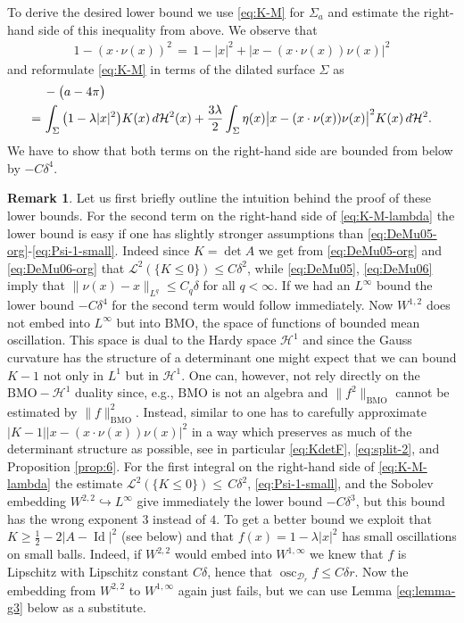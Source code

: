 \documentclass[reqno,makeidx,12pt]{amsart}
\theoremstyle{note}
\theoremstyle{definition}
\newtheorem*{remark-short}{Remark}
\begin{document}
To derive the desired lower bound we use \eqref{eq:K-M} for $\Sigma_a$ and estimate the right-hand side of this inequality from above. We observe that
\begin{gather*}
	1-(x\cdot\nu(x))^2 \,=\, 1 - |x|^2 + |x- (x\cdot\nu(x))\nu(x)|^2
\end{gather*}
and reformulate \eqref{eq:K-M} in terms of the dilated surface $\Sigma$ as
\begin{align}
	&-\big(a-4\pi\big)\notag\\
	=\, & \int_{\Sigma} \big(1-\lambda |x|^2\big)K(x)\,d{\ensuremath{\mathcal{H}}}^2(x) + \frac{3\lambda}{2}\int_\Sigma \eta(x) \big|x-(x\cdot\nu(x))\nu(x)\big|^2K(x)\,d{\ensuremath{\mathcal{H}}}^2. \label{eq:K-M-lambda}
\end{align}
We have to show that both terms on the right-hand side are bounded from below by $-C\delta^4$.
\begin{remark-short}
 Let us first briefly outline the intuition behind the proof of these lower bounds.
For the second term on the right-hand side of \eqref{eq:K-M-lambda} the lower bound is easy if one has slightly stronger assumptions than \eqref{eq:DeMu05-org}-\eqref{eq:Psi-1-small}. Indeed since $K=\det A$ we get from \eqref{eq:DeMu05-org} and \eqref{eq:DeMu06-org} that ${\ensuremath{\mathcal{L}}}^2(\{K\leq 0\})\leq C\delta^2$, while \eqref{eq:DeMu05}, \eqref{eq:DeMu06} imply that $\|\nu(x)-x\|_{L^q}\leq C_q\delta$ for all $q<\infty$. If we had an $L^\infty$ bound the lower bound $-C\delta^4$ for the second term would follow immediately. Now $W^{1,2}$ does not embed into $L^\infty$ but into ${\ensuremath{\text{BMO}}}$, the space of functions of bounded mean oscillation. This space is dual to the Hardy space ${\ensuremath{\mathcal{H}}}^1$ and since the Gauss curvature has the structure of a determinant one might expect that we can bound $K-1$ not only in $L^1$ but in ${\ensuremath{\mathcal{H}}}^1$. One can, however, not rely directly on the ${\ensuremath{\text{BMO}}}-{\ensuremath{\mathcal{H}}}^1$ duality since, e.g., ${\ensuremath{\text{BMO}}}$ is not an algebra and $\|f^2\|_{\ensuremath{\text{BMO}}}$ cannot be estimated by $\|f\|_{\ensuremath{\text{BMO}}}^2$. Instead, similar to \cite{DeMu05} one has to carefully approximate $|K-1||x-(x\cdot\nu(x))\nu(x)|^2$ in a way which preserves as much of the determinant structure as possible, see in particular \eqref{eq:KdetF}, \eqref{eq:split-2}, and Proposition \ref{prop:6}. For the first integral on the right-hand side of \eqref{eq:K-M-lambda} the estimate ${\ensuremath{\mathcal{L}}}^2(\{K\leq 0\})\leq\, C\delta^2$, \eqref{eq:Psi-1-small}, and the Sobolev embedding $W^{2,2}\hookrightarrow L^\infty$ give immediately the lower bound $-C\delta^3$, but this bound has the wrong exponent $3$ instead of $4$. To get a better bound we exploit that $K\geq \frac{1}{2} - 2|A-\operatorname{Id}|^2$ (see below) and that $f(x)=1-\lambda |x|^2$ has small oscillations on small balls. Indeed, if $W^{2,2}$ would embed into $W^{1,\infty}$ we knew that $f$ is Lipschitz with Lipschitz constant $C\delta$, hence that $\operatorname{osc}_{{\mathcal{D}}_r} f \leq C\delta r$. Now the embedding  from $W^{2,2}$ to $W^{1,\infty}$ again just fails, but we can use Lemma \ref{eq:lemma-g3} below as a substitute.
\end{remark-short}
\end{document}

